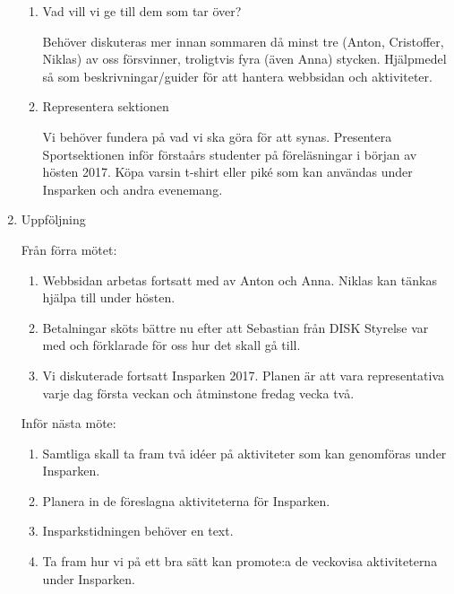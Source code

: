 \documentclass[12pt,a4paper]{article}
\begin{document}
\begin{enumerate}
\begin{enumerate}
				\item Vad vill vi ge till dem som tar över?
				    
				    Behöver diskuteras mer innan sommaren då minst tre (Anton, Cristoffer, Niklas) av oss försvinner, troligtvis fyra (även Anna) stycken. Hjälpmedel så som beskrivningar/guider för att hantera webbsidan och aktiviteter.
				    
				\item Representera sektionen
				    
				    Vi behöver fundera på vad vi ska göra för att synas. Presentera Sportsektionen inför förstaårs studenter på föreläsningar i början av hösten 2017. Köpa varsin t-shirt eller piké som kan användas under Insparken och andra evenemang.
				    
			\end{enumerate}
		    
		\item Uppföljning
		    
		    Från förra mötet:
		    \begin{enumerate}
		        
				\item Webbsidan arbetas fortsatt med av Anton och Anna. Niklas kan tänkas hjälpa till under hösten.
				
				\item Betalningar sköts bättre nu efter att Sebastian från DISK Styrelse var med och förklarade för oss hur det skall gå till.
				
				\item Vi diskuterade fortsatt Insparken 2017. Planen är att vara representativa varje dag första veckan och åtminstone fredag vecka två.
					
			\end{enumerate}
			
			Inför nästa möte:
			\begin{enumerate}
				
				\item Samtliga skall ta fram två idéer på aktiviteter som kan genomföras under Insparken.
			    
				\item Planera in de föreslagna aktiviteterna för Insparken.
				
				\item Insparkstidningen behöver en text.
				
				\item Ta fram hur vi på ett bra sätt kan promote:a de veckovisa aktiviteterna under Insparken.
				

\end{enumerate}
\end{enumerate}
\end{document}
